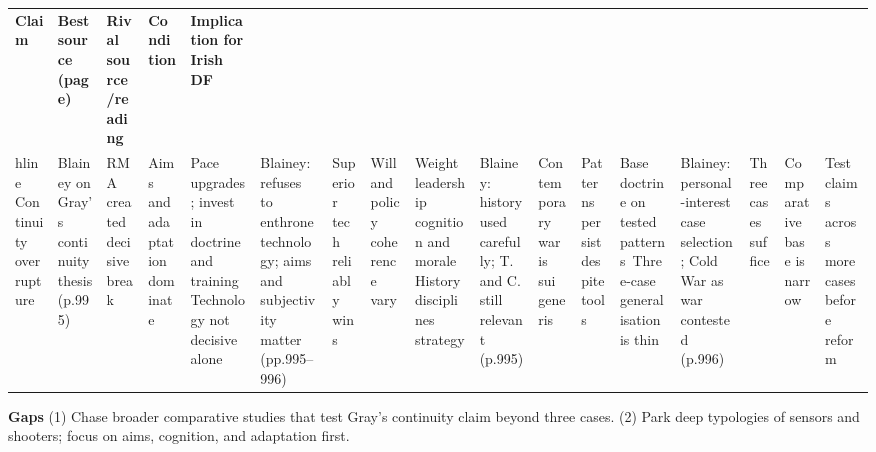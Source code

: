 \usepackage{array}
\begin{tabular}{p{3.2cm}p{4.2cm}p{3.6cm}p{3.2cm}p{4.2cm}}
	\textbf{Claim} & \textbf{Best source (page)} & \textbf{Rival source/reading} & \textbf{Condition} & \textbf{Implication for Irish DF}\\hline
	Continuity over rupture & Blainey on Gray’s continuity thesis (p.995) & RMA created decisive break & Aims and adaptation dominate & Pace upgrades; invest in doctrine and training\
	Technology not decisive alone & Blainey: refuses to enthrone technology; aims and subjectivity matter (pp.995–996) & Superior tech reliably wins & Will and policy coherence vary & Weight leadership cognition and morale\
	History disciplines strategy & Blainey: history used carefully; T. and C. still relevant (p.995) & Contemporary war is sui generis & Patterns persist despite tools & Base doctrine on tested patterns\
	Three-case generalisation is thin & Blainey: personal-interest case selection; Cold War as war contested (p.996) & Three cases suffice & Comparative base is narrow & Test claims across more cases before reform\
\end{tabular}


\textbf{Gaps}
(1) Chase broader comparative studies that test Gray’s continuity claim beyond three cases.
(2) Park deep typologies of sensors and shooters; focus on aims, cognition, and adaptation first.

\parencite{BROSE_2019}
